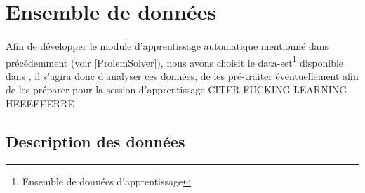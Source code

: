 
\section{Ensemble de données}
\paragraph{}
Afin de développer le module d'apprentissage automatique mentionné dans précédemment (voir \ref{ProlemSolver}), nous avons choisit le data-set\footnote{Ensemble de données d'apprentissage} disponible dans \cite{dataset}, il s'agira donc d'analyser ces données, de les pré-traiter éventuellement afin de les préparer pour la session d'apprentissage CITER FUCKING  LEARNING HEEEEEERRE
\subsection{Description des données}
